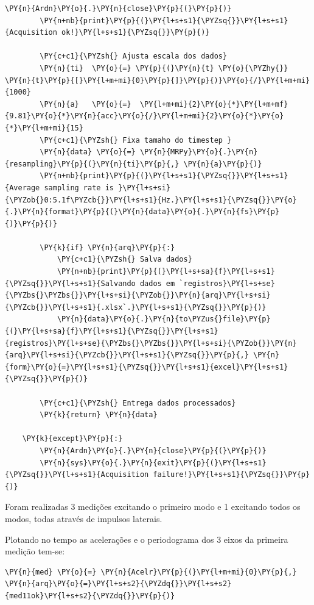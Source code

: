 \begin{tcolorbox}[breakable, size=fbox, boxrule=1pt, pad at break*=1mm,colback=cellbackground, colframe=cellborder]
\begin{Verbatim}[commandchars=\\\{\}]
        \PY{n}{Ardn}\PY{o}{.}\PY{n}{close}\PY{p}{(}\PY{p}{)}
        \PY{n+nb}{print}\PY{p}{(}\PY{l+s+s1}{\PYZsq{}}\PY{l+s+s1}{Acquisition ok!}\PY{l+s+s1}{\PYZsq{}}\PY{p}{)}

        \PY{c+c1}{\PYZsh{} Ajusta escala dos dados}
        \PY{n}{ti}  \PY{o}{=} \PY{p}{(}\PY{n}{t} \PY{o}{\PYZhy{}} \PY{n}{t}\PY{p}{[}\PY{l+m+mi}{0}\PY{p}{]}\PY{p}{)}\PY{o}{/}\PY{l+m+mi}{1000}
        \PY{n}{a}   \PY{o}{=}  \PY{l+m+mi}{2}\PY{o}{*}\PY{l+m+mf}{9.81}\PY{o}{*}\PY{n}{acc}\PY{o}{/}\PY{l+m+mi}{2}\PY{o}{*}\PY{o}{*}\PY{l+m+mi}{15}
        \PY{c+c1}{\PYZsh{} Fixa tamaho do timestep }
        \PY{n}{data} \PY{o}{=} \PY{n}{MRPy}\PY{o}{.}\PY{n}{resampling}\PY{p}{(}\PY{n}{ti}\PY{p}{,} \PY{n}{a}\PY{p}{)}
        \PY{n+nb}{print}\PY{p}{(}\PY{l+s+s1}{\PYZsq{}}\PY{l+s+s1}{Average sampling rate is }\PY{l+s+si}{\PYZob{}0:5.1f\PYZcb{}}\PY{l+s+s1}{Hz.}\PY{l+s+s1}{\PYZsq{}}\PY{o}{.}\PY{n}{format}\PY{p}{(}\PY{n}{data}\PY{o}{.}\PY{n}{fs}\PY{p}{)}\PY{p}{)}

        \PY{k}{if} \PY{n}{arq}\PY{p}{:}
            \PY{c+c1}{\PYZsh{} Salva dados}
            \PY{n+nb}{print}\PY{p}{(}\PY{l+s+sa}{f}\PY{l+s+s1}{\PYZsq{}}\PY{l+s+s1}{Salvando dados em `registros}\PY{l+s+se}{\PYZbs{}\PYZbs{}}\PY{l+s+si}{\PYZob{}}\PY{n}{arq}\PY{l+s+si}{\PYZcb{}}\PY{l+s+s1}{.xlsx`.}\PY{l+s+s1}{\PYZsq{}}\PY{p}{)}
            \PY{n}{data}\PY{o}{.}\PY{n}{to\PYZus{}file}\PY{p}{(}\PY{l+s+sa}{f}\PY{l+s+s1}{\PYZsq{}}\PY{l+s+s1}{registros}\PY{l+s+se}{\PYZbs{}\PYZbs{}}\PY{l+s+si}{\PYZob{}}\PY{n}{arq}\PY{l+s+si}{\PYZcb{}}\PY{l+s+s1}{\PYZsq{}}\PY{p}{,} \PY{n}{form}\PY{o}{=}\PY{l+s+s1}{\PYZsq{}}\PY{l+s+s1}{excel}\PY{l+s+s1}{\PYZsq{}}\PY{p}{)}

        \PY{c+c1}{\PYZsh{} Entrega dados processados}
        \PY{k}{return} \PY{n}{data}
        
    \PY{k}{except}\PY{p}{:}
        \PY{n}{Ardn}\PY{o}{.}\PY{n}{close}\PY{p}{(}\PY{p}{)}
        \PY{n}{sys}\PY{o}{.}\PY{n}{exit}\PY{p}{(}\PY{l+s+s1}{\PYZsq{}}\PY{l+s+s1}{Acquisition failure!}\PY{l+s+s1}{\PYZsq{}}\PY{p}{)}
\end{Verbatim}
\end{tcolorbox}

    Foram realizadas 3 medições excitando o primeiro modo e 1 excitando
todos os modos, todas através de impulsos laterais.

Plotando no tempo as acelerações e o periodograma dos 3 eixos da
primeira medição tem-se:

    \begin{tcolorbox}[breakable, size=fbox, boxrule=1pt, pad at break*=1mm,colback=cellbackground, colframe=cellborder]
\begin{Verbatim}[commandchars=\\\{\}]
\PY{n}{med} \PY{o}{=} \PY{n}{Acelr}\PY{p}{(}\PY{l+m+mi}{0}\PY{p}{,} \PY{n}{arq}\PY{o}{=}\PY{l+s+s2}{\PYZdq{}}\PY{l+s+s2}{med11ok}\PY{l+s+s2}{\PYZdq{}}\PY{p}{)}
\end{Verbatim}
\end{tcolorbox}

